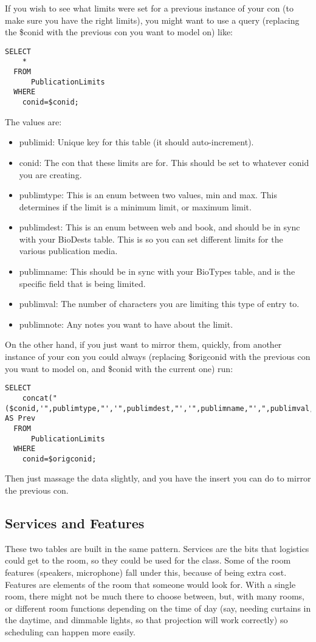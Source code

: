 \documentclass[captions=tablesignature]{scrartcl}
\begin{document}
If you wish to see what limits were set for a previous instance of
your con (to make sure you have the right limits), you might want
to use a query (replacing the \$conid with the previous con you want
to model on) like:
\begin{verbatim}
SELECT
    *
  FROM
      PublicationLimits
  WHERE
    conid=$conid;
\end{verbatim}
The values are:
\begin{itemize}
\item publimid: Unique key for this table (it should auto-increment).
\item conid: The con that these limits are for.  This should be set to
whatever conid you are creating.
\item publimtype: This is an enum between two values, min and max.
This determines if the limit is a minimum limit, or maximum
limit.
\item publimdest: This is an enum between web and book, and should be
in sync with your BioDests table.  This is so you can set
different limits for the various publication media.
\item publimname: This should be in sync with your BioTypes table, and
is the specific field that is being limited.
\item publimval: The number of characters you are limiting this type of
entry to.
\item publimnote: Any notes you want to have about the limit.
\end{itemize}

On the other hand, if you just want to mirror them, quickly, from
another instance of your con you could always (replacing \$origconid
with the previous con you want to model on, and \$conid with the
current one) run:
\begin{verbatim}
SELECT
    concat("($conid,'",publimtype,"','",publimdest,"','",publimname,"',",publimval,",'",publimnote,"'),") AS Prev
  FROM
      PublicationLimits
  WHERE
    conid=$origconid;
\end{verbatim}
Then just massage the data slightly, and you have the insert you
can do to mirror the previous con.

\subsection{Services and Features}
\label{sec-13-2}

These two tables are built in the same pattern.  Services are the
bits that logistics could get to the room, so they could be used
for the class.  Some of the room features (speakers, microphone)
fall under this, because of being extra cost.  Features are
elements of the room that someone would look for.  With a single
room, there might not be much there to choose between, but, with
many rooms, or different room functions depending on the time of
day (say, needing curtains in the daytime, and dimmable lights, so
that projection will work correctly) so scheduling can happen more
easily.
\end{document}
